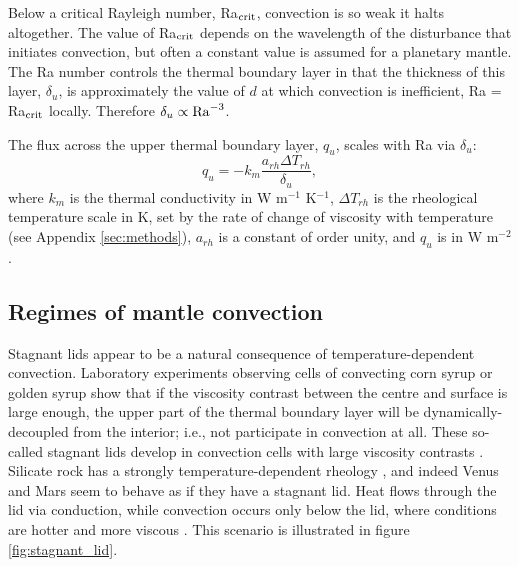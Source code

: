Below a critical Rayleigh number, Ra$_{\rm crit}$, convection is so weak it halts altogether. The value of Ra$_{\rm crit}$ depends on the wavelength of the disturbance that initiates convection, but often a constant value is assumed for a planetary mantle. The Ra number controls the thermal boundary layer in that the thickness of this layer, $\delta_u$, is approximately the value of $d$ at which convection is inefficient, Ra = Ra$_{\rm crit}$ locally. Therefore $\delta_u \propto {\rm Ra}^{-3}$.

The flux across the upper thermal boundary layer, $q_u$, scales with Ra via $\delta_u$:
\begin{equation}\label{eq:q_Ra}
q_{u} = -k_m \frac{a_{rh} \Delta T_{rh}}{\delta_{u}},
\end{equation}
where $k_m$ is the thermal conductivity in W m$^{-1}$ K$^{-1}$, $\Delta T_{rh}$ is the rheological temperature scale in K, set by the rate of change of viscosity with temperature (see Appendix \ref{sec:methods}), $a_{rh}$ is a constant of order unity, and $q_u$ is in W m$^{-2}$.




\subsection{Regimes of mantle convection}

Stagnant lids appear to be a natural consequence of temperature-dependent convection. Laboratory experiments observing cells of convecting corn syrup or golden syrup show that if the viscosity contrast between the centre and surface is large enough, the upper part of the thermal boundary layer will be dynamically-decoupled from the interior; i.e., not participate in convection at all. These so-called stagnant lids develop in convection cells with large viscosity contrasts \citep{Davaille1993, Giannandrea1993}. Silicate rock has a strongly temperature-dependent rheology \citep{Karato1993}, and indeed Venus and Mars seem to behave as if they have a stagnant lid. Heat flows through the lid via conduction, while convection occurs only below the lid, where conditions are hotter and more viscous \citep{Morris1984, Christensen1984, Hansen1993, Solomatov1995}. %
This scenario is illustrated in figure \ref{fig:stagnant_lid}.

